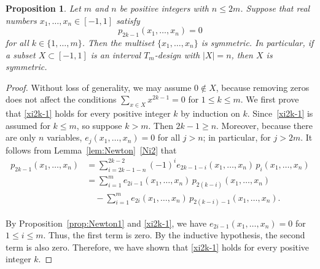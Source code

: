 \documentclass[11pt]{amsart}
\newtheorem{prop}[thm]{Proposition}
\theoremstyle{definition}
\newcommand{\iantipodal}{symmetric}
\begin{document}
\begin{prop}
\label{prop:antipodal2}
Let \( m \) and \( n \) be positive integers with \( n\le 2m \). Suppose that real numbers \( x_1,\dots,x_n\in[-1,1] \) satisfy
\begin{equation}\label{xi2k-1}
p_{2k-1}(x_1,\dots,x_n)=0
\end{equation}
for all \( k\in\{1,\dots,m\} \). Then the multiset \(\{x_1,\dots,x_n\}\) is \iantipodal. In particular, if a subset \( X\subset[-1,1] \) is an interval \( T_m \)-design with \(|X|=n\), 
then \( X \) is \iantipodal.
\end{prop}
\begin{proof}
Without loss of generality, we may assume \(0\notin X\), because removing zeros does not affect the conditions \(\sum_{x\in X} x^{2k-1}=0\) for \(1\le k\le m\).
We first prove that \eqref{xi2k-1} holds for every positive integer \( k \) by induction on \( k \). Since~\ref{xi2k-1} is assumed for \( k\le m \), so suppose \( k>m \). Then \( 2k-1\ge n \). 
Moreover, because there are only \( n \) variables, \( e_j(x_1,\dots,x_n)=0 \) for all \( j>n \); in particular, for \( j>2m \). 
It follows from Lemma~\ref{lem:Newton}~\ref{Ni2} that
\begin{align*}
p_{2k-1}(x_1,\dots,x_n) &= \sum_{i=2k-1-n}^{2k-2} (-1)^i e_{2k-1-i}(x_1,\dots,x_n) \, p_i(x_1,\dots,x_n)\\
&=\sum_{i=1}^{m} e_{2i-1}(x_1,\dots,x_n) \, p_{2(k-i)}(x_1,\dots,x_n)\\
&\quad-\sum_{i=1}^{m} e_{2i}(x_1,\dots,x_n) \, p_{2(k-i)-1}(x_1,\dots,x_n).
\end{align*}


By Proposition~\ref{prop:Newton1} and \eqref{xi2k-1}, 
we have $e_{2i-1}(x_1,\dots,x_n)=0$ for $1\leq i\leq m$.
Thus, the first term is zero.
By the inductive hypothesis,
the second term
is also zero.
Therefore, we have shown that
\eqref{xi2k-1} holds for every positive integer $k$.


\end{proof}
\end{document}
